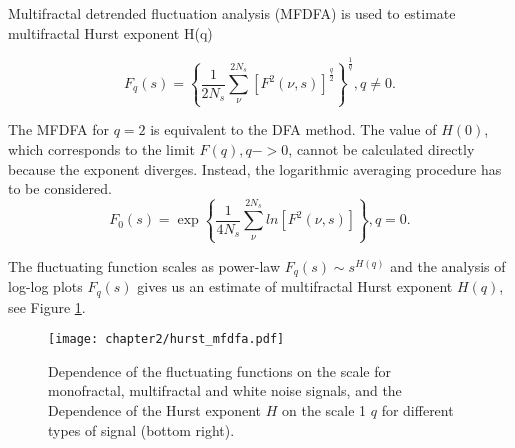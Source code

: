

Multifractal detrended fluctuation analysis (MFDFA) is used \cite{kantelhardt2002, ihlen2012} to estimate multifractal Hurst exponent H(q) 

\begin{equation}
F_q(s) = \left\{\frac{1}{2N_s}\sum_{\nu}^{2N_s}\left[F^2(\nu, s)\right]^{\frac{q}{2}}\right\}^{\frac{1}{q}},  q \neq 0 \nonumber.
\end{equation}

The MFDFA for $q=2$ is equivalent to the DFA method. The value of $H(0)$, which corresponds to the limit $F(q), q -> 0$, cannot be calculated directly because the exponent diverges. Instead, the logarithmic averaging procedure has to be considered. 
\begin{equation}
F_0(s) = \exp \left\{\frac{1}{4N_s}\sum_{\nu}^{2N_s}ln \left[F^2(\nu, s)\right]\right\}, q=0.
\end{equation}

The fluctuating function scales as power-law $F_q(s) \sim s^{H(q)}$ and the analysis of log-log plots $F_q(s)$ gives us an estimate of multifractal Hurst exponent $H(q)$, see Figure \ref{fig:hurst_mfdfa}.

\begin{figure}[H]
	\centering
	\texttt{[image: chapter2/hurst\_mfdfa.pdf]}
	\caption[Fluctuating function and Hurst exponent.]{Dependence of the fluctuating functions on the scale for monofractal, multifractal and white noise signals, and the Dependence of the Hurst exponent $H$ on the scale 1 $q$ for different types of signal (bottom right).}
	\label{fig:hurst_mfdfa}
\end{figure}

